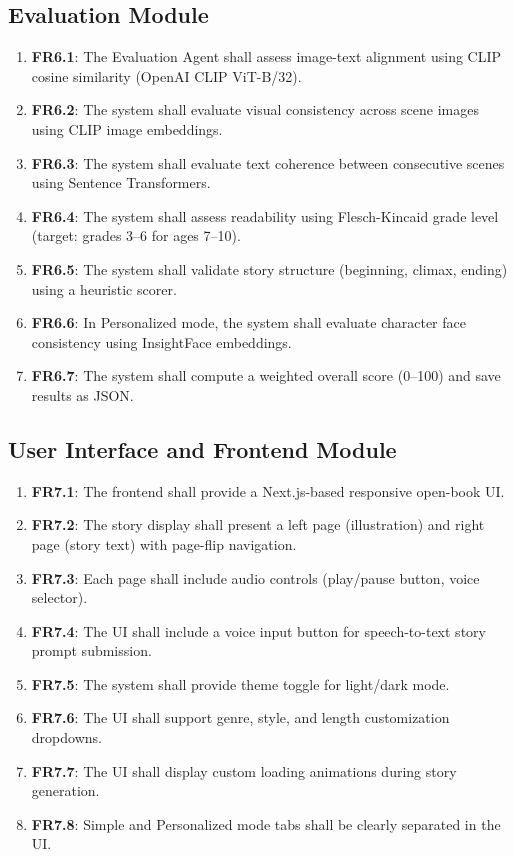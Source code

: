 \subsection{Evaluation Module}
\begin{enumerate}
    \item \textbf{FR6.1}: The Evaluation Agent shall assess image-text alignment using CLIP cosine similarity (OpenAI CLIP ViT-B/32).
    \item \textbf{FR6.2}: The system shall evaluate visual consistency across scene images using CLIP image embeddings.
    \item \textbf{FR6.3}: The system shall evaluate text coherence between consecutive scenes using Sentence Transformers.
    \item \textbf{FR6.4}: The system shall assess readability using Flesch-Kincaid grade level (target: grades 3--6 for ages 7--10).
    \item \textbf{FR6.5}: The system shall validate story structure (beginning, climax, ending) using a heuristic scorer.
    \item \textbf{FR6.6}: In Personalized mode, the system shall evaluate character face consistency using InsightFace embeddings.
    \item \textbf{FR6.7}: The system shall compute a weighted overall score (0--100) and save results as JSON.
\end{enumerate}

\subsection{User Interface and Frontend Module}
\begin{enumerate}
    \item \textbf{FR7.1}: The frontend shall provide a Next.js-based responsive open-book UI.
    \item \textbf{FR7.2}: The story display shall present a left page (illustration) and right page (story text) with page-flip navigation.
    \item \textbf{FR7.3}: Each page shall include audio controls (play/pause button, voice selector).
    \item \textbf{FR7.4}: The UI shall include a voice input button for speech-to-text story prompt submission.
    \item \textbf{FR7.5}: The system shall provide theme toggle for light/dark mode.
    \item \textbf{FR7.6}: The UI shall support genre, style, and length customization dropdowns.
    \item \textbf{FR7.7}: The UI shall display custom loading animations during story generation.
    \item \textbf{FR7.8}: Simple and Personalized mode tabs shall be clearly separated in the UI.
\end{enumerate}


